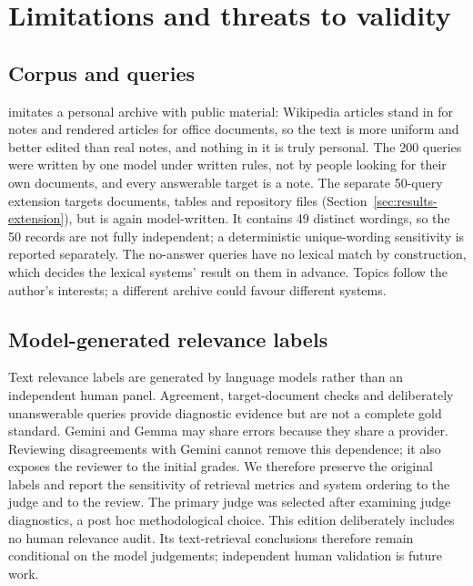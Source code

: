 \section{Limitations and threats to validity}\label{sec:limitations}

\subsection{Corpus and queries}
\uapar{} imitates a personal archive with public material: Wikipedia articles stand in for notes and rendered articles for office documents, so the text is more uniform and better edited than real notes, and nothing in it is truly personal. The 200 queries were written by one model under written rules, not by people looking for their own documents, and every answerable target is a note. The separate 50-query extension targets documents, tables and repository files (Section~\ref{sec:results-extension}), but is again model-written. It contains 49 distinct wordings, so the 50 records are not fully independent; a deterministic unique-wording sensitivity is reported separately. The no-answer queries have no lexical match by construction, which decides the lexical systems' result on them in advance. Topics follow the author's interests; a different archive could favour different systems.

\subsection{Model-generated relevance labels}
Text relevance labels are generated by language models rather than an independent human panel. Agreement, target-document checks and deliberately unanswerable queries provide diagnostic evidence but are not a complete gold standard. Gemini and Gemma may share errors because they share a provider. Reviewing disagreements with Gemini cannot remove this dependence; it also exposes the reviewer to the initial grades. We therefore preserve the original labels and report the sensitivity of retrieval metrics and system ordering to the judge and to the review. The primary judge was selected after examining judge diagnostics, a post hoc methodological choice. This edition deliberately includes no human relevance audit. Its text-retrieval conclusions therefore remain conditional on the model judgements; independent human validation is future work.

